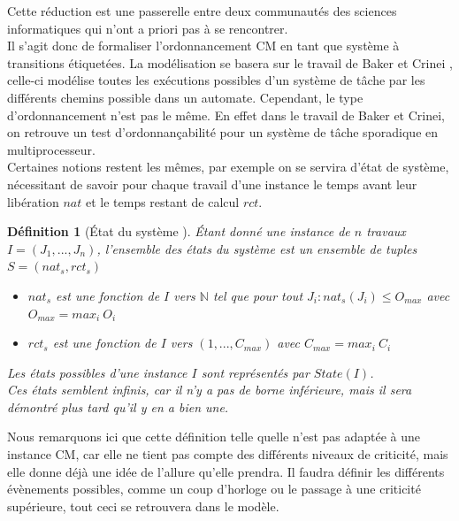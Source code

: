 \documentclass[12pt,a4paper,oneside]{book}
\theoremstyle{break}
\newtheorem{defin}{Définition}[chapter]
\theoremstyle{breakplain}
\begin{document}
Cette réduction est une passerelle entre deux communautés des sciences informatiques qui n'ont a priori pas à se rencontrer.\\

Il s'agit donc de formaliser l'ordonnancement CM en tant que système à transitions étiquetées. La modélisation se basera sur le travail de Baker et Crinei \cite{bakerbrute}, celle-ci modélise toutes les exécutions possibles d'un système de tâche par les différents chemins possible dans un automate. Cependant, le type d'ordonnancement n'est pas le même. En effet dans le travail de Baker et Crinei, on retrouve un test d'ordonnançabilité pour un système de tâche sporadique en multiprocesseur.\\

Certaines notions restent les mêmes, par exemple on se servira d'état de système, nécessitant de savoir pour chaque travail d'une instance le temps avant leur libération $nat$ et le temps restant de calcul $rct$.

\begin{defin}[État du système \cite{geeraerts2013multiprocessor}]
Étant donné une instance de $n$ travaux $I = (J_1, ..., J_n)$, l'ensemble des états du système est un ensemble de tuples $S = (nat_s, rct_s)$
\begin{itemize}
\item $nat_s$ est une fonction de $I$ vers $\mathbb{N}$ tel que pour tout $J_i : nat_s(J_i) \leq O_{max}$ avec $O_{max} = max_i\ O_i$
\item $rct_s$ est une fonction de $I$ vers $(1,...,C_{max})$ avec $C_{max} = max_i\ C_i$
\end{itemize}

Les états possibles d'une instance $I$ sont représentés par $State(I)$.\\
Ces états semblent infinis, car il n'y a pas de borne inférieure, mais il sera démontré plus tard qu'il y en a bien une.
\end{defin}

Nous remarquons ici que cette définition telle quelle n'est pas adaptée à une instance CM, car elle ne tient pas compte des différents niveaux de criticité, mais elle donne déjà une idée de l'allure qu'elle prendra. Il faudra définir les différents évènements possibles, comme un coup d'horloge ou le passage à une criticité supérieure, tout ceci se retrouvera dans le modèle.
\end{document}
